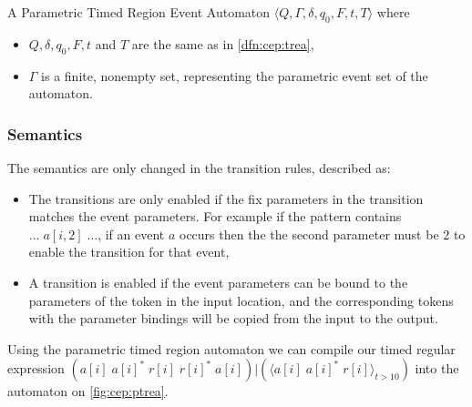 			

			\begin{dfn}
				\label{dfn:cep:ptrea}
				A Parametric Timed Region Event Automaton $\langle Q,\Gamma,\delta,q_0, F, t, T \rangle$ where
				\begin{itemize}
					\item $Q, \delta, q_0, F, t$ and  $T$ are the same as in \cref{dfn:cep:trea},
					\item $\Gamma$ is a finite, nonempty set, representing the parametric event set of the automaton.
				\end{itemize}
			\end{dfn}

			\subsubsection{Semantics}
			\label{cep:trea:semantics}

			The semantics are only changed in the transition rules, described as:
			\begin{itemize}
				\item The transitions are only enabled if the fix parameters in the transition matches the event parameters. For example if the pattern contains $\dots \; a[i,2] \; \dots$, if an event $a$ occurs then the the second parameter must be $2$ to enable the transition for that event,
				\item A transition is enabled if the event parameters can be bound to the parameters of the token in the input location, and the corresponding tokens with the parameter bindings will be copied from the input to the output.
			\end{itemize}
	
			Using the parametric timed region automaton we can compile our timed regular expression 
			$(a[i] \; a[i]^\ast \; r[i] \; r[i]^\ast \; a[i]) | (\langle a[i] \; a[i]^\ast \; r[i]\rangle_{t > 10} )$ into the automaton on \cref{fig:cep:ptrea}.
	
